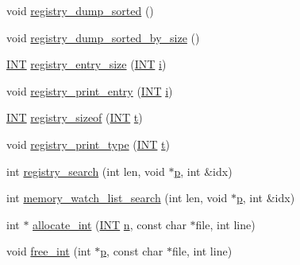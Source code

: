 \begin{DoxyCompactItemize}
\item 
void \mbox{\hyperlink{_g_a_l_o_i_s_2memory_8_c_aa28c9ee8650332ad2d526d5eb4fae48e}{registry\+\_\+dump\+\_\+sorted}} ()
\item 
void \mbox{\hyperlink{_g_a_l_o_i_s_2memory_8_c_a219b9a76e136e450523d924ce80734bc}{registry\+\_\+dump\+\_\+sorted\+\_\+by\+\_\+size}} ()
\item 
\mbox{\hyperlink{galois_8h_a09fddde158a3a20bd2dcadb609de11dc}{I\+NT}} \mbox{\hyperlink{_g_a_l_o_i_s_2memory_8_c_abb7fc0eff582133f5bd8a7cbd78d742b}{registry\+\_\+entry\+\_\+size}} (\mbox{\hyperlink{galois_8h_a09fddde158a3a20bd2dcadb609de11dc}{I\+NT}} \mbox{\hyperlink{alphabet2_8_c_acb559820d9ca11295b4500f179ef6392}{i}})
\item 
void \mbox{\hyperlink{_g_a_l_o_i_s_2memory_8_c_a2b54b210ed9aae58085d1ef7fa3bcbff}{registry\+\_\+print\+\_\+entry}} (\mbox{\hyperlink{galois_8h_a09fddde158a3a20bd2dcadb609de11dc}{I\+NT}} \mbox{\hyperlink{alphabet2_8_c_acb559820d9ca11295b4500f179ef6392}{i}})
\item 
\mbox{\hyperlink{galois_8h_a09fddde158a3a20bd2dcadb609de11dc}{I\+NT}} \mbox{\hyperlink{_g_a_l_o_i_s_2memory_8_c_a1ebe71d1cd99d79db497355f608be044}{registry\+\_\+sizeof}} (\mbox{\hyperlink{galois_8h_a09fddde158a3a20bd2dcadb609de11dc}{I\+NT}} \mbox{\hyperlink{alphabet2_8_c_ac310d9181e916ba43604099aee272c71}{t}})
\item 
void \mbox{\hyperlink{_g_a_l_o_i_s_2memory_8_c_a0c81861cc8a6dd21364c89bb3ac8e82c}{registry\+\_\+print\+\_\+type}} (\mbox{\hyperlink{galois_8h_a09fddde158a3a20bd2dcadb609de11dc}{I\+NT}} \mbox{\hyperlink{alphabet2_8_c_ac310d9181e916ba43604099aee272c71}{t}})
\item 
int \mbox{\hyperlink{_g_a_l_o_i_s_2memory_8_c_a01e5fb20556471832a045ea75de89a78}{registry\+\_\+search}} (int len, void $\ast$\mbox{\hyperlink{alphabet2_8_c_a533391314665d6bf1b5575e9a9cd8552}{p}}, int \&idx)
\item 
int \mbox{\hyperlink{_g_a_l_o_i_s_2memory_8_c_a3dc6479d362d6d48bf915d940e643d86}{memory\+\_\+watch\+\_\+list\+\_\+search}} (int len, void $\ast$\mbox{\hyperlink{alphabet2_8_c_a533391314665d6bf1b5575e9a9cd8552}{p}}, int \&idx)
\item 
int $\ast$ \mbox{\hyperlink{_g_a_l_o_i_s_2memory_8_c_a9b47024ab51fba0a4caa91b135180600}{allocate\+\_\+int}} (\mbox{\hyperlink{galois_8h_a09fddde158a3a20bd2dcadb609de11dc}{I\+NT}} \mbox{\hyperlink{simeon_8_c_a7f2cd26777ce0ff3fdaf8d02aacbddfb}{n}}, const char $\ast$file, int line)
\item 
void \mbox{\hyperlink{_g_a_l_o_i_s_2memory_8_c_a7bf175a1bca98275657b4ee10f95e457}{free\+\_\+int}} (int $\ast$\mbox{\hyperlink{alphabet2_8_c_a533391314665d6bf1b5575e9a9cd8552}{p}}, const char $\ast$file, int line)

\end{DoxyCompactItemize}
